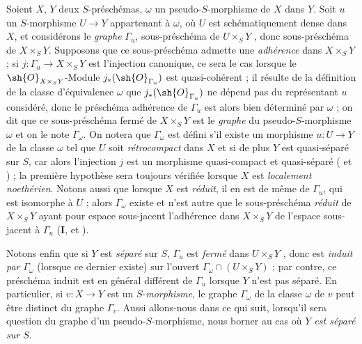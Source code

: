 \begin{env}[20.4.1]
Soient $X$, $Y$ deux $S$-préschémas, $\omega$ un pseudo-$S$-morphisme de $X$ dans $Y$.
Soit $u$ un $S$-morphisme $U\to Y$ appartenant à $\omega$, où $U$ est schématiquement dense dans $X$, et considérons le \emph{graphe} $\Gamma_u$, sous-préschéma de $U\times_S Y$ , donc sous-préschéma de $X\times_S Y$.
Supposons que ce sous-préschéma admette une \emph{adhérence}  dans $X\times_S Y$ ; si $j:\Gamma_u\to X\times_S Y$ est l'injection canonique, ce sera le cas lorsque le $\sh{O}_{X\times_S Y}$-Module $j_*(\sh{O}_{\Gamma_u})$ est quasi-cohérent ; il résulte de la définition de la classe d'équivalence $\omega$  que $j_*(\sh{O}_{\Gamma_u})$ ne dépend pas du représentant $u$ considéré, donc le préschéma adhérence de $\Gamma_u$ est alors bien déterminé par $\omega$ ; on dit que ce sous-préschéma fermé de $X\times_S Y$ est le \emph{graphe} du pseudo-$S$-morphisme $\omega$ et on le note $\Gamma_\omega$.
On notera que $\Gamma_\omega$ est défini s'il existe un morphisme $u:U\to Y$ de la classe $\omega$ tel que $U$ soit \emph{rétrocompact} dans $X$ et si de plus $Y$ est quasi-séparé sur $S$, car alors l'injection $j$ est un morphisme quasi-compact et quasi-séparé ( et ) ; la première hypothèse sera toujours vérifiée lorsque $X$ est \emph{localement noethérien}.
Notons aussi que lorsque $X$ est \emph{réduit}, il en est de même de $\Gamma_u$, qui est isomorphe à $U$  ; alors $\Gamma_\omega$ existe et n'est autre que le sous-préschéma \emph{réduit} de $X\times_S Y$ ayant pour espace sous-jacent l'adhérence dans $X\times_S Y$ de l'espace sous-jacent à $\Gamma_u$ (\textbf{I},  et ).

Notons enfin que si $Y$ est \emph{séparé} sur $S$, $\Gamma_u$ est \emph{fermé} dans $U\times_S Y$ , donc est \emph{induit par} $\Gamma_\omega$ (lorsque ce dernier existe) sur l'ouvert $\Gamma_\omega\cap(U\times_S Y)$  ; par contre, ce préschéma induit est en général différent de $\Gamma_u$ lorsque $Y$ n'est pas séparé.
En particulier, si $v:X\to Y$ est un $S$-\emph{morphisme}, le graphe $\Gamma_\omega$ de la classe $\omega$ de $v$ peut être distinct du graphe $\Gamma_v$.
Aussi allons-nous dans ce qui suit, lorsqu'il sera question du graphe d'un pseudo-$S$-morphisme, nous borner au cas où \emph{$Y$ est séparé sur $S$}.
\end{env}

